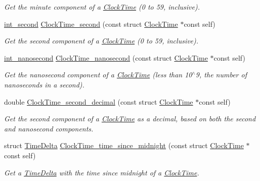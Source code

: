 \begin{DoxyCompactItemize}
\begin{DoxyCompactList}\small\item\em \-Get the minute component of a \hyperlink{structClockTime}{\-Clock\-Time} (0 to 59, inclusive). \end{DoxyCompactList}\item 
\hyperlink{types_8h_abd3494f4b69b446ec1fc0477a8b769c9}{int\-\_\-second} \hyperlink{clock-time_8h_abd89cc75c460c6b9b906c2b433e0f29c}{\-Clock\-Time\-\_\-second} (const struct \hyperlink{structClockTime}{\-Clock\-Time} $\ast$const self)
\begin{DoxyCompactList}\small\item\em \-Get the second component of a \hyperlink{structClockTime}{\-Clock\-Time} (0 to 59, inclusive). \end{DoxyCompactList}\item 
\hyperlink{types_8h_a153ef9bf3a8448179ab1d606f5593b4c}{int\-\_\-nanosecond} \hyperlink{clock-time_8h_a68bdc6e05da575968f51c2fcff6bcb8e}{\-Clock\-Time\-\_\-nanosecond} (const struct \hyperlink{structClockTime}{\-Clock\-Time} $\ast$const self)
\begin{DoxyCompactList}\small\item\em \-Get the nanosecond component of a \hyperlink{structClockTime}{\-Clock\-Time} (less than 10$^\wedge$9, the number of nanoseconds in a second). \end{DoxyCompactList}\item 
double \hyperlink{clock-time_8h_a182c395d606d26c144cdb75096a0125d}{\-Clock\-Time\-\_\-second\-\_\-decimal} (const struct \hyperlink{structClockTime}{\-Clock\-Time} $\ast$const self)
\begin{DoxyCompactList}\small\item\em \-Get the second component of a \hyperlink{structClockTime}{\-Clock\-Time} as a decimal, based on both the second and nanosecond components. \end{DoxyCompactList}\item 
struct \hyperlink{structTimeDelta}{\-Time\-Delta} \hyperlink{clock-time_8h_ace4db26641fe01b2edd311b09589ebbb}{\-Clock\-Time\-\_\-time\-\_\-since\-\_\-midnight} (const struct \hyperlink{structClockTime}{\-Clock\-Time} $\ast$const self)
\begin{DoxyCompactList}\small\item\em \-Get a \hyperlink{structTimeDelta}{\-Time\-Delta} with the time since midnight of a \hyperlink{structClockTime}{\-Clock\-Time}. \end{DoxyCompactList}\item 

\end{DoxyCompactItemize}
